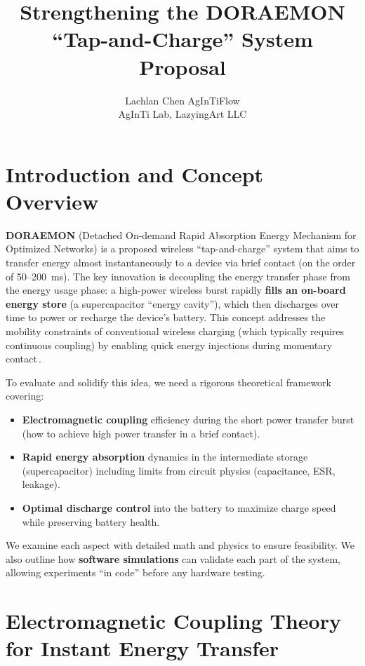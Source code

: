 \documentclass[11pt]{article}
\title{Strengthening the DORAEMON ``Tap-and-Charge'' System Proposal}
\author{\begin{tabular}{c}Lachlan Chen \quad AgInTiFlow\\AgInTi Lab, LazyingArt LLC\end{tabular}}
\date{}
\begin{document}
\maketitle

\section{Introduction and Concept Overview}
\textbf{DORAEMON} (Detached On-demand Rapid Absorption Energy Mechanism for Optimized Networks) is a proposed wireless ``tap-and-charge'' system that aims to transfer energy almost instantaneously to a device via brief contact (on the order of 50--200~ms). The key innovation is decoupling the energy transfer phase from the energy usage phase: a high-power wireless burst rapidly \textbf{fills an on-board energy store} (a supercapacitor ``energy cavity''), which then discharges over time to power or recharge the device's battery. This concept addresses the mobility constraints of conventional wireless charging (which typically requires continuous coupling) by enabling quick energy injections during momentary contact\,\cite{volfpack-blog}.

To evaluate and solidify this idea, we need a rigorous theoretical framework covering:
\begin{itemize}
  \item \textbf{Electromagnetic coupling} efficiency during the short power transfer burst (how to achieve high power transfer in a brief contact).
  \item \textbf{Rapid energy absorption} dynamics in the intermediate storage (supercapacitor) including limits from circuit physics (capacitance, ESR, leakage).
  \item \textbf{Optimal discharge control} into the battery to maximize charge speed while preserving battery health.
\end{itemize}
We examine each aspect with detailed math and physics to ensure feasibility. We also outline how \textbf{software simulations} can validate each part of the system, allowing experiments ``in code'' before any hardware testing.

\section{Electromagnetic Coupling Theory for Instant Energy Transfer}
\end{document}
